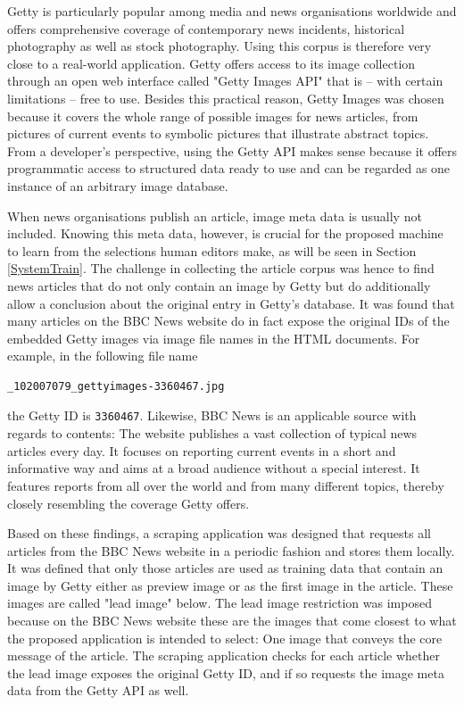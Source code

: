 \documentclass[11pt,a4paper,twoside]{article}
\begin{document}
Getty is particularly popular among media and news organisations worldwide and offers comprehensive coverage of contemporary news incidents, historical photography as well as stock photography. Using this corpus is therefore very close to a real-world application. Getty offers access to its image collection through an open web interface called "Getty Images API" \cite{GettyImagesAPIOverview} that is -- with certain limitations -- free to use. Besides this practical reason, Getty Images was chosen because it covers the whole range of possible images for news articles, from pictures of current events to symbolic pictures that illustrate abstract topics. From a developer's perspective, using the Getty API makes sense because it offers programmatic access to structured data ready to use and can be regarded as one instance of an arbitrary image database.

When news organisations publish an article, image meta data is usually not included. Knowing this meta data, however, is crucial for the proposed machine to learn from the selections human editors make, as will be seen in Section \ref{SystemTrain}. The challenge in collecting the article corpus was hence to find news articles that do not only contain an image by Getty but do additionally allow a conclusion about the original entry in Getty's database. It was found that many articles on the BBC News website do in fact expose the original IDs of the embedded Getty images via image file names in the HTML documents. For example, in the following file name

\begin{lstlisting}
_102007079_gettyimages-3360467.jpg
\end{lstlisting}

\noindent the Getty ID is \lstinline{3360467}. Likewise, BBC News is an applicable source with regards to contents: The website publishes a vast collection of typical news articles every day. It focuses on reporting current events in a short and informative way and aims at a broad audience without a special interest. It features reports from all over the world and from many different topics, thereby closely resembling the coverage Getty offers.

Based on these findings, a scraping application was designed that requests all articles from the BBC News website in a periodic fashion and stores them locally. It was defined that only those articles are used as training data that contain an image by Getty either as preview image or as the first image in the article. These images are called "lead image" below. The lead image restriction was imposed because on the BBC News website these are the images that come closest to what the proposed application is intended to select: One image that conveys the core message of the article. The scraping application checks for each article whether the lead image exposes the original Getty ID, and if so requests the image meta data from the Getty API as well.
\end{document}
